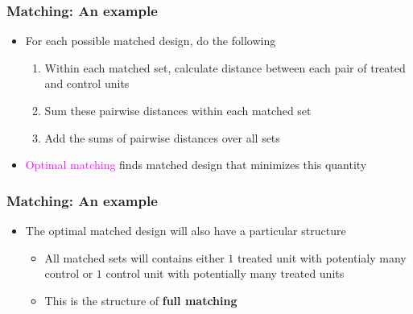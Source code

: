 \documentclass[table, xcolor = {dvipsnames}, 9pt]{beamer}
\theoremstyle{plain}
\begin{document}
\begin{frame}[t]
\frametitle{Matching: An example}
\vfill
\begin{itemize} \vfill
\item For each possible matched design, do the following \vfill
\begin{enumerate} \vfill
\item Within each matched set, calculate distance between each pair of treated and control units \vfill
\item Sum these pairwise distances within each matched set \vfill
\item Add the sums of pairwise distances over all sets \vfill
\end{enumerate} \vfill
\item \textcolor{magenta}{Optimal matching} finds matched design that minimizes this quantity
\end{itemize} \vfill
\end{frame}
\begin{frame}[t]
\frametitle{Matching: An example}
\vfill
\begin{itemize} \vfill
\item The optimal matched design will also have a particular structure \vfill
\begin{itemize} \vfill
\item All matched sets will contains either $1$ treated unit with potentialy many control or $1$ control unit with potentially many treated units \vfill
\item This is the structure of \textbf{full matching} \citep{hansen2004} \vfill
\end{itemize} \vfill
\end{itemize} \vfill
\end{frame}
\end{document}
